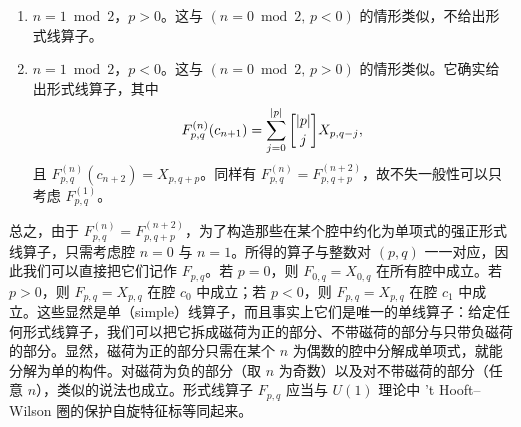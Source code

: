 \begin{enumerate}
\item $n=1\bmod 2$，$p>0$。这与 $(n=0\bmod 2,\,p<0)$ 的情形类似，不给出形式线算子。

\item $n=1\bmod 2$，$p<0$。这与 $(n=0\bmod 2,\,p>0)$ 的情形类似。它确实给出形式线算子，其中
\begin{equation}\label{eq:n-odd-p-neg}
F^{(n)}_{p,q}(c_{n+1}) = \sum_{j=0}^{|p|} \qbinom{|p|}{j} X_{p,q-j},
\end{equation}
且 $F^{(n)}_{p,q}(c_{n+2})=X_{p,q+p}$。同样有 $F^{(n)}_{p,q}=F^{(n+2)}_{p,q+p}$，故不失一般性可以只考虑 $F^{(1)}_{p,q}$。

\end{enumerate}

总之，由于 $F^{(n)}_{p,q}=F^{(n+2)}_{p,q+p}$，为了构造那些在某个腔中约化为单项式的强正形式线算子，只需考虑腔 $n=0$ 与 $n=1$。所得的算子与整数对 $(p,q)$ 一一对应，因此我们可以直接把它们记作 $F_{p,q}$。若 $p=0$，则 $F_{0,q}=X_{0,q}$ 在所有腔中成立。若 $p>0$，则 $F_{p,q}=X_{p,q}$ 在腔 $c_0$ 中成立；若 $p<0$，则 $F_{p,q}=X_{p,q}$ 在腔 $c_1$ 中成立。这些显然是单（simple）线算子，而且事实上它们是唯一的单线算子：给定任何形式线算子，我们可以把它拆成磁荷为正的部分、不带磁荷的部分与只带负磁荷的部分。显然，磁荷为正的部分只需在某个 $n$ 为偶数的腔中分解成单项式，就能分解为单的构件。对磁荷为负的部分（取 $n$ 为奇数）以及对不带磁荷的部分（任意 $n$），类似的说法也成立。形式线算子 $F_{p,q}$ 应当与 $U(1)$ 理论中 't Hooft--Wilson 圈的保护自旋特征标等同起来。

